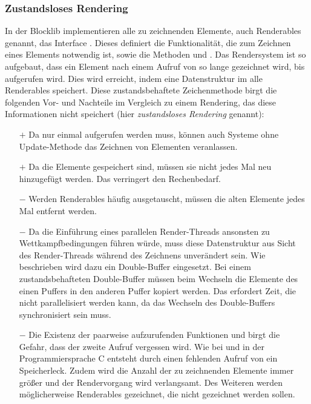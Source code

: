 \subsubsection{Zustandsloses Rendering}\label{sec:statelessRendering}
In der Blocklib implementieren alle zu zeichnenden Elemente, auch Renderables genannt, das Interface \classRenderable{}. Dieses definiert die Funktionalität, die zum Zeichnen eines Elements notwendig ist, sowie die Methoden  und . Das Rendersystem ist so aufgebaut, dass ein Element nach einem Aufruf von  so lange gezeichnet wird, bis  aufgerufen wird. Dies wird erreicht, indem eine Datenstruktur im \classMasterRenderer{} alle Renderables speichert. Diese zustandsbehaftete Zeichenmethode birgt die folgenden Vor- und Nachteile im Vergleich zu einem Rendering, das diese Informationen nicht speichert (hier \emph{zustandsloses Rendering} genannt):

\begin{itemize}
	\item[$+$] Da  nur einmal aufgerufen werden muss, können auch Systeme ohne Update-Methode das Zeichnen von Elementen veranlassen.
	\item[$+$] Da die Elemente gespeichert sind, müssen sie nicht jedes Mal neu hinzugefügt werden. Das verringert den Rechenbedarf.
	\item[$-$] Werden Renderables häufig ausgetauscht, müssen die alten Elemente jedes Mal entfernt werden.
	\item[$-$] Da die Einführung eines parallelen Render-Threads ansonsten zu Wettkampfbedingungen führen würde, muss diese Datenstruktur aus Sicht des Render-Threads während des Zeichnens unverändert sein. Wie beschrieben wird dazu ein Double-Buffer eingesetzt. Bei einem zustandsbehafteten Double-Buffer müssen beim Wechseln die Elemente des einen Puffers in den anderen Puffer kopiert werden. Das erfordert Zeit, die nicht parallelisiert werden kann, da das Wechseln des Double-Buffers synchronisiert sein muss.
	\item[$-$] Die Existenz der paarweise aufzurufenden Funktionen  und  birgt die Gefahr, dass der zweite Aufruf vergessen wird. Wie bei  und  in der Programmiersprache C entsteht durch einen fehlenden Aufruf von  ein Speicherleck. Zudem wird die Anzahl der zu zeichnenden Elemente immer größer und der Rendervorgang wird verlangsamt. Des Weiteren werden möglicherweise Renderables gezeichnet, die nicht gezeichnet werden sollen.
\end{itemize}

